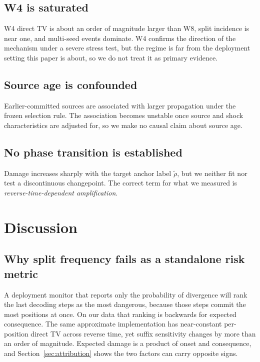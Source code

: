 \documentclass[11pt,a4paper]{article}
\theoremstyle{plain}
\theoremstyle{definition}
\theoremstyle{remark}
\newcommand{\rholabel}{\widetilde{\rho}}
\begin{document}
\subsection{W4 is saturated}
\label{sec:w4}
W4 direct TV is about an order of magnitude larger than W8, split incidence is
near one, and multi-seed events dominate. W4 confirms the direction of the
mechanism under a severe stress test, but the regime is far from the deployment
setting this paper is about, so we do not treat it as primary evidence.

\subsection{Source age is confounded}
Earlier-committed sources are associated with larger propagation under the frozen
selection rule. The association becomes unstable once source and shock
characteristics are adjusted for, so we make no causal claim about source age.

\subsection{No phase transition is established}
Damage increases sharply with the target anchor label $\rholabel$, but we neither fit nor test a discontinuous
changepoint. The correct term for what we measured is
\emph{reverse-time-dependent amplification}.

\section{Discussion}

\subsection{Why split frequency fails as a standalone risk metric}
A deployment monitor that reports only the probability of divergence will rank
the last decoding steps as the most dangerous, because those steps commit the
most positions at once. On our data that ranking is backwards for expected
consequence. The same approximate implementation has near-constant per-position
direct TV across reverse time, yet suffix sensitivity changes by more than an
order of magnitude. Expected damage is a product of onset and consequence, and
Section~\ref{sec:attribution} shows the two factors can carry opposite signs.
\end{document}
